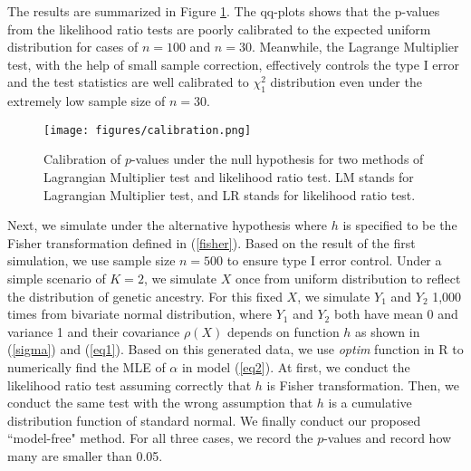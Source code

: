 \documentclass[12pt]{extarticle}
\theoremstyle{theorem}
\begin{document}
\noindent The results are summarized in Figure \ref{calibration}. The qq-plots shows that the p-values from the likelihood ratio tests are poorly calibrated to the expected uniform distribution for cases of $n=100$ and $n=30$. Meanwhile, the Lagrange Multiplier test, with the help of small sample correction, effectively controls the type I error and the test statistics are well calibrated to $\chi_1^2$ distribution even under the extremely low sample size of $n=30$.

\begin{figure}[ht]
    \centering
    \texttt{[image: figures/calibration.png]}
    \caption{\label{calibration} Calibration of $p$-values under the null hypothesis for two methods of Lagrangian Multiplier test and likelihood ratio test. LM stands for Lagrangian Multiplier test, and LR stands for likelihood ratio test.}
\end{figure}


\noindent Next, we simulate under the alternative hypothesis where $h$ is specified to be the Fisher transformation defined in (\ref{fisher}). Based on the result of the first simulation, we use sample size $n=500$ to ensure type I error control. Under a simple scenario of $K=2$, we simulate $X$ once from uniform distribution to reflect the distribution of genetic ancestry. For this fixed $X$, we simulate $Y_1$ and $Y_2$ 1,000 times from bivariate normal distribution, where $Y_1$ and $Y_2$ both have mean 0 and variance 1 and their covariance $\rho(X)$ depends on function $h$ as shown in (\ref{sigma}) and (\ref{eq1}). Based on this generated data, we use \textit{optim} function in R to numerically find the MLE of $\alpha$ in model (\ref{eq2}). At first, we conduct the likelihood ratio test assuming correctly that $h$ is Fisher transformation. Then, we conduct the same test with the wrong assumption that $h$ is a cumulative distribution function of standard normal. We finally conduct our proposed ``model-free" method. For all three cases, we record the $p$-values and record how many are smaller than 0.05. \\
\end{document}
